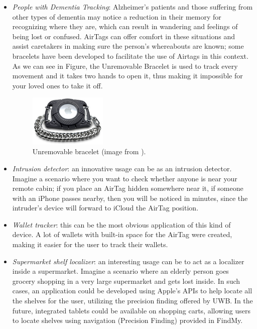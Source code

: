 \documentclass[english]{article}
\begin{document}
\begin{itemize}
  \item \textit{People with Dementia Tracking}: Alzheimer's patients and those suffering from other types of dementia may notice a reduction in their memory for recognizing where they are, which can result in wandering and feelings of being lost or confused. AirTags can offer comfort in these situations and assist caretakers in making sure the person's whereabouts are known; some bracelets have been developed to facilitate the use of Airtags in this context. As we can see in Figure, the Unremovable Bracelet is used to track every movement and it takes two hands to open it, thus making it impossible for your loved ones to take it off.
  \begin{figure}[]
    \centering
    \includegraphics[width=0.35\textwidth]{images/AirT-Blk-Sm.jpg}
    \caption{Unremovable bracelet (image from \cite{bracelets}).}
    \label{img:controller}
  \end{figure}
  \item \textit{Intrusion detector}: an innovative usage can be as an intrusion detector. Imagine a scenario where you want to check whether anyone is near your remote cabin; if you place an AirTag hidden somewhere near it, if someone with an iPhone passes nearby, then you will be noticed in minutes, since the intruder's device will forward to iCloud the AirTag position.
  \item \textit{Wallet tracker}: this can be the most obvious application of this kind of device. A lot of wallets with built-in space for the AirTag were created, making it easier for the user to track their wallets.
  \item \textit{Supermarket shelf localizer}: an interesting usage can be to act as a localizer inside a supermarket. Imagine a scenario where an elderly person goes grocery shopping in a very large supermarket and gets lost inside. In such cases, an application could be developed using Apple's APIs to help locate all the shelves for the user, utilizing the precision finding offered by UWB. In the future, integrated tablets could be available on shopping carts, allowing users to locate shelves using navigation (Precision Finding) provided in FindMy.
\end{itemize}
\end{document}
